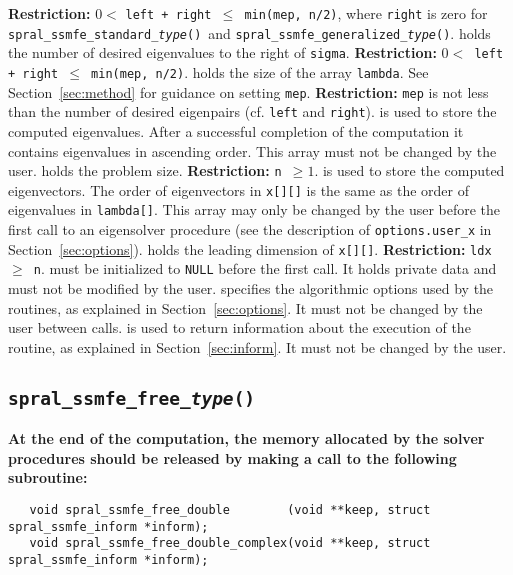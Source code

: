 \begin{description}
{\bf Restriction:} {$0 <$ \tt left + right $\le$ min(mep, n/2)},
where {\tt right} is zero for 
{\tt spral\_ssmfe\_standard\_\textit{type}()}\ and
{\tt spral\_ssmfe\_generalized\_\textit{type}()}.
%
 holds the number of desired eigenvalues to the right of {\tt sigma}.
{\bf Restriction:} {\tt $0 < $ left + right $\le$ min(mep, n/2)}.
%
 holds the size of the array {\tt lambda}.
See Section~\ref{sec:method} for guidance on
setting {\tt mep}.
{\bf Restriction:} 
{\tt mep} is not less than the number of desired eigenpairs
(cf. {\tt left} and {\tt right}).
%
 is
used to store the computed eigenvalues.
After a successful completion of the computation
it contains eigenvalues in ascending order.
This array must not be changed by the user.
%
 holds the problem size.
{\bf Restriction:} {\tt n $\ge 1$}.
%
 is
used to store the computed eigenvectors.
The order of eigenvectors in {\tt x[][]}
is the same as the order of eigenvalues in {\tt lambda[]}.
This array may only be changed by the user
before the first call to an eigensolver procedure
(see the description of {\tt options.user\_x} in Section~\ref{sec:options}).
%
 holds the leading dimension of {\tt x[][]}.
{\bf Restriction:} {\tt ldx $\ge$ n}.
%
 must be initialized to \texttt{NULL} before the first call.
It holds private data and must not be modified by the user.
%
 specifies the algorithmic options used by the routines,
as explained in Section~\ref{sec:options}.
It must not be changed by the user between calls.
%
 is used to return information about the execution of the
routine, as explained in Section~\ref{sec:inform}.
It must not be changed by the user.
%
\end{description}

\subsection{\texttt{spral\_ssmfe\_free\_\textit{type}()}}

{\bf
At the end of the computation, the memory 
allocated by the solver procedures
should be released
by making a call to the following subroutine:
}

\begin{verbatim}
   void spral_ssmfe_free_double        (void **keep, struct spral_ssmfe_inform *inform);
   void spral_ssmfe_free_double_complex(void **keep, struct spral_ssmfe_inform *inform);
\end{verbatim}

